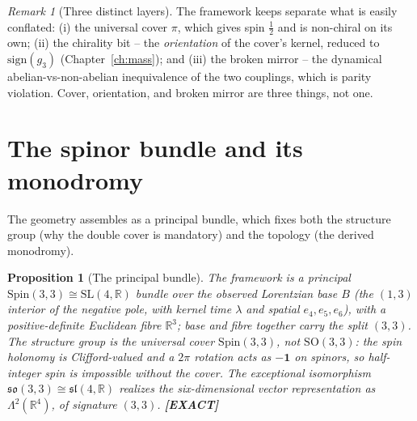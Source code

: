 \documentclass[11pt,oneside]{book}
\newcommand{\RR}{\mathbb{R}}
\newcommand{\so}{\mathfrak{so}}
\newcommand{\Spin}{\mathrm{Spin}}
\newcommand{\status}[1]{{\sffamily\bfseries\color{statuscol}[#1]}}
\theoremstyle{plain}
\newtheorem{proposition}[theorem]{Proposition}
\theoremstyle{definition}
\theoremstyle{remark}
\newtheorem{remark}[theorem]{Remark}
\begin{document}
\begin{remark}[Three distinct layers]
The framework keeps separate what is easily conflated: (i) the universal cover
$\pi$, which gives spin $\tfrac12$ and is non-chiral on its own; (ii) the chirality
bit -- the \emph{orientation} of the cover's kernel, reduced to $\mathrm{sign}(g_3)$
(Chapter~\ref{ch:mass}); and (iii) the broken mirror -- the dynamical
abelian-vs-non-abelian inequivalence of the two couplings, which is parity violation.
Cover, orientation, and broken mirror are three things, not one.
\end{remark}

\section{The spinor bundle and its monodromy}
\label{sec:bundle}

The geometry assembles as a principal bundle, which fixes both the structure group
(why the double cover is mandatory) and the topology (the derived monodromy).

\begin{proposition}[The principal bundle]
\label{prop:bundle}
The framework is a principal $\Spin(3,3)\cong\mathrm{SL}(4,\RR)$ bundle over the
observed Lorentzian base $B$ (the $(1,3)$ interior of the negative pole, with kernel
time $\lambda$ and spatial $e_4,e_5,e_6$), with a positive-definite Euclidean fibre
$\RR^3$; base and fibre together carry the split $(3,3)$. The structure group is the
\emph{universal cover} $\Spin(3,3)$, not $\mathrm{SO}(3,3)$: the spin holonomy is
Clifford-valued and a $2\pi$ rotation acts as $-\mathbf 1$ on spinors, so half-integer
spin is impossible without the cover. The exceptional isomorphism
$\so(3,3)\cong\mathfrak{sl}(4,\RR)$ realizes the six-dimensional vector representation
as $\Lambda^2(\RR^4)$, of signature $(3,3)$. \status{EXACT}
\end{proposition}
\end{document}
